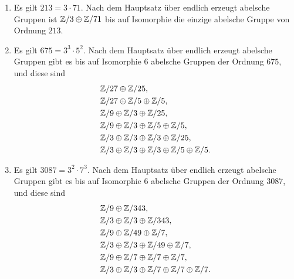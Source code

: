 \begin{solution}
  \begin{enumerate}
    \item
      Es gilt $213 = 3 \cdot 71$.
      Nach dem Hauptsatz über endlich erzeugt abelsche Gruppen ist $\mathbb{Z}/3 \oplus \mathbb{Z}/71$ bis auf Isomorphie die einzige abelsche Gruppe von Ordnung $213$.
      
    \item
      Es gilt $675 = 3^3 \cdot 5^2$.
      Nach dem Hauptsatz über endlich erzeugt abelsche Gruppen gibt es bis auf Isomorphie $6$ abelsche Gruppen der Ordnung $675$, und diese sind
      \begin{align*}
        &\,\mathbb{Z}/27 \oplus \mathbb{Z}/25,
        \\
        &\,\mathbb{Z}/27 \oplus \mathbb{Z}/5 \oplus \mathbb{Z}/5,
        \\
        &\,\mathbb{Z}/9 \oplus \mathbb{Z}/3 \oplus \mathbb{Z}/25,
        \\
        &\,\mathbb{Z}/9 \oplus \mathbb{Z}/3 \oplus \mathbb{Z}/5 \oplus \mathbb{Z}/5,
        \\
        &\,\mathbb{Z}/3 \oplus \mathbb{Z}/3 \oplus \mathbb{Z}/3 \oplus \mathbb{Z}/25,
        \\
        &\,\mathbb{Z}/3 \oplus \mathbb{Z}/3 \oplus \mathbb{Z}/3 \oplus \mathbb{Z}/5 \oplus \mathbb{Z}/5.
      \end{align*}
      
    \item
      Es gilt $3087 = 3^2 \cdot 7^3$.
      Nach dem Hauptsatz über endlich erzeugt abelsche Gruppen gibt es bis auf Isomorphie $6$ abelsche Gruppen der Ordnung $3087$, und diese sind
      \begin{align*}
        &\,\mathbb{Z}/9 \oplus \mathbb{Z}/343,
        \\
        &\,\mathbb{Z}/3 \oplus \mathbb{Z}/3 \oplus \mathbb{Z}/343,
        \\
        &\,\mathbb{Z}/9 \oplus \mathbb{Z}/49 \oplus \mathbb{Z}/7,
        \\
        &\,\mathbb{Z}/3 \oplus \mathbb{Z}/3 \oplus \mathbb{Z}/49 \oplus \mathbb{Z}/7,
        \\
        &\,\mathbb{Z}/9 \oplus \mathbb{Z}/7 \oplus \mathbb{Z}/7 \oplus \mathbb{Z}/7,
        \\
        &\,\mathbb{Z}/3 \oplus \mathbb{Z}/3 \oplus \mathbb{Z}/7 \oplus \mathbb{Z}/7 \oplus \mathbb{Z}/7.
      \end{align*}
      

\end{enumerate}
\end{solution}
